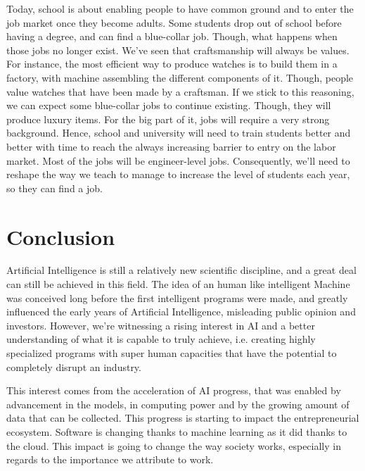 \documentclass[12pt]{article}
\begin{document}
Today, school is about enabling people to have common ground and to enter the
job market once they become adults. Some students drop out of school before
having a degree, and can find a blue-collar job. Though, what happens when those
jobs no longer exist.
We've seen that craftsmanship will always be values. For instance, the most
efficient way to produce watches is to build them in a factory, with machine
assembling the different components of it. Though, people value watches that have
been made by a craftsman. If we stick to this reasoning, we can expect some
blue-collar jobs to continue existing. Though, they will produce luxury items.
For the big part of it, jobs will require a very strong background. Hence,
school and university will need to train students better and better with time to
reach the always increasing barrier to entry on the labor market. Most of the
jobs will be engineer-level jobs.
Consequently, we'll need to reshape the way we teach to manage to increase the
level of students each year, so they can find a job.

\pagebreak


\section*{Conclusion}\label{conclusion}


Artificial Intelligence is still a relatively new scientific discipline, and a
great deal can still be achieved in this field. The idea of an human like
intelligent Machine was conceived long before the first intelligent programs
were made, and greatly influenced the early years of Artificial Intelligence,
misleading public opinion and investors. However, we're witnessing a rising
interest in AI and a better understanding of what it  is capable to truly
achieve, i.e. creating highly specialized programs with super  human capacities
that have the potential to completely disrupt an industry.

This interest comes from the  acceleration of AI progress, that was enabled by
advancement in the models, in  computing power and by the growing amount of data
that can be collected. This  progress is starting to impact the entrepreneurial
ecosystem. Software is  changing thanks to machine learning as it did thanks to
the cloud. This impact is going to change the way society works, especially in
regards to the  importance we attribute to work.
\end{document}
